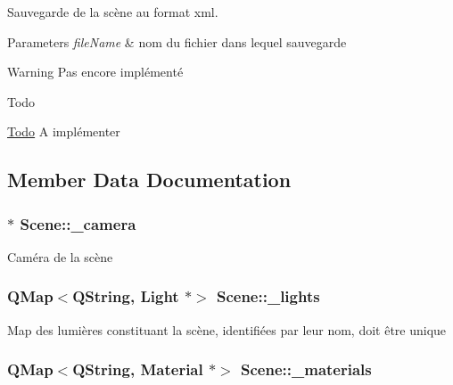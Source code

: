 Sauvegarde de la scène au format xml. 


\begin{DoxyParams}{Parameters}
{\em file\+Name} & nom du fichier dans lequel sauvegarde \\
\hline
\end{DoxyParams}
\begin{DoxyWarning}{Warning}
Pas encore implémenté 
\end{DoxyWarning}
\begin{DoxyRefDesc}{Todo}
\item[\hyperlink{todo__todo000006}{Todo}]A implémenter \end{DoxyRefDesc}


\subsection{Member Data Documentation}
\hypertarget{class_scene_a8cce9e0f96edc8655a9b9a885e2c26bf}{
\subsubsection[{\+\_\+camera}]{$\ast$ Scene\+::\+\_\+camera}}\label{class_scene_a8cce9e0f96edc8655a9b9a885e2c26bf}
Caméra de la scène \hypertarget{class_scene_a0ef33120973d6afc1754d2154d7c338a}{
\subsubsection[{\+\_\+lights}]{\setlength{\rightskip}{0pt plus 5cm}Q\+Map$<$Q\+String, {\bf Light} $\ast$$>$ Scene\+::\+\_\+lights\hspace{0.3cm}{\ttfamily [private]}}}\label{class_scene_a0ef33120973d6afc1754d2154d7c338a}
Map des lumières constituant la scène, identifiées par leur nom, doit être unique \hypertarget{class_scene_a5b96810fdeb47632d5ce6c2c47f41691}{
\subsubsection[{\+\_\+materials}]{\setlength{\rightskip}{0pt plus 5cm}Q\+Map$<$Q\+String, {\bf Material} $\ast$$>$ Scene\+::\+\_\+materials\hspace{0.3cm}{\ttfamily [private]}}}\label{class_scene_a5b96810fdeb47632d5ce6c2c47f41691}
